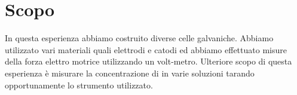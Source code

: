 \section*{Scopo}
In questa esperienza abbiamo costruito diverse celle galvaniche.
Abbiamo utilizzato vari materiali quali elettrodi e catodi ed abbiamo effettuato misure della forza elettro motrice utilizzando un volt-metro.
Ulteriore scopo di questa esperienza è misurare la concentrazione di  in varie soluzioni tarando opportunamente lo strumento utilizzato.
